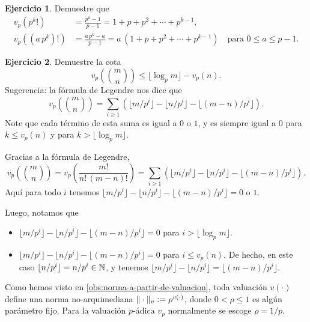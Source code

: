 \documentclass{article}
\numberwithin{equation}{section}
\theoremstyle{definition}
\newtheorem{ejerc}{Ejercicio}
\begin{document}
\begin{ejerc}
  Demuestre que
  \begin{align*}
    v_p (p^k!) & = \frac{p^k - 1}{p-1} =
                 1 + p + p^2 + \cdots + p^{k-1},\\
    v_p ((a\,p^k)!) & = \frac{a\,p^k - a}{p-1} =
                      a\,(1 + p + p^2 + \cdots + p^{k-1})
                      \quad\text{para }0 \le a \le p-1.
  \end{align*}
\end{ejerc}

\begin{ejerc}
  Demuestre la cota
  $$v_p \left({m \choose n}\right) \le \lfloor\log_p m\rfloor - v_p (n).$$
  Sugerencia: la fórmula de Legendre nos dice que
  \[ v_p \left({m \choose n}\right) =
    \sum_{i\ge 1} (\lfloor m/p^i\rfloor - \lfloor n/p^i\rfloor - \lfloor (m-n)/p^i\rfloor). \]
  Note que cada término de esta suma es igual a $0$ o $1$, y es siempre igual
  a $0$ para $k \le v_p (n)$ y para $k > \lfloor\log_p m\rfloor$.

  \ifdefined\solutions\begin{solucion}
    Gracias a la fórmula de Legendre,
    \[ v_p \left({m \choose n}\right) =
       v_p \left(\frac{m!}{n!\,(m-n)!}\right) =
       \sum_{i\ge 1} (\lfloor m/p^i\rfloor - \lfloor n/p^i\rfloor - \lfloor (m-n)/p^i\rfloor). \]
    Aquí para todo $i$ tenemos
    $\lfloor m/p^i\rfloor - \lfloor n/p^i\rfloor - \lfloor (m-n)/p^i\rfloor = 0\text{ o }1$.

    Luego, notamos que
    \begin{itemize}
    \item $\lfloor m/p^i\rfloor - \lfloor n/p^i\rfloor - \lfloor (m-n)/p^i\rfloor = 0$
      para $i > \lfloor\log_p m\rfloor$.

    \item $\lfloor m/p^i\rfloor - \lfloor n/p^i\rfloor - \lfloor (m-n)/p^i\rfloor = 0$
      para $i \le v_p (n)$. De hecho, en este caso
      $\lfloor n/p^i\rfloor = n/p^i \in \mathbb{N}$, y tenemos
      $\lfloor m/p^i\rfloor - \lfloor n/p^i\rfloor = \lfloor (m-n)/p^i\rfloor$.
    \end{itemize}
  \end{solucion}\fi
\end{ejerc}

Como hemos visto en \ref{obs:norma-a-partir-de-valuacion}, toda valuación
$v (\cdot)$ define una norma no-arquimediana
$\|\cdot\|_v \mathrel{\mathop:}= \rho^{v (\cdot)}$, donde $0 < \rho \le 1$ es algún parámetro
fijo. Para la valuación $p$-ádica $v_p$ normalmente se escoge $\rho = 1/p$.
\end{document}
